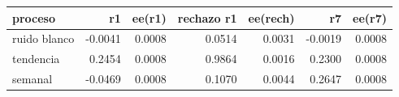 \begin{tabular}{lrrrrrr}
\toprule
proceso & r1 & ee(r1) & rechazo r1 & ee(rech) & r7 & ee(r7) \\
\midrule
ruido blanco & -0.0041 & 0.0008 & 0.0514 & 0.0031 & -0.0019 & 0.0008 \\
tendencia & 0.2454 & 0.0008 & 0.9864 & 0.0016 & 0.2300 & 0.0008 \\
semanal & -0.0469 & 0.0008 & 0.1070 & 0.0044 & 0.2647 & 0.0008 \\
\bottomrule
\end{tabular}
